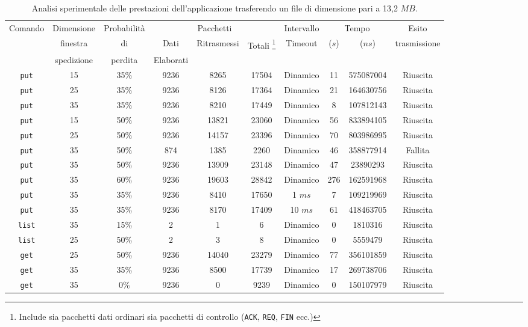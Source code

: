 \documentclass[10pt,a4paper, titlepage]{report}
\begin{document}
\begin{savenotes}
\begin{table}[H]
\caption{Analisi sperimentale delle prestazioni dell'applicazione trasferendo un file di dimensione pari a 13,2 $MB$.}\label{table:diana}
\centering
\begin{adjustbox}{width=1.3\textwidth,center=\textwidth}
\small
\begin{tabular}{ccc|ccc|c|cc|c}

\toprule
\multirow{3}{*}{Comando} & 
Dimensione & 
Probabilità & 
\multicolumn{3}{c|}{Pacchetti} & 
Intervallo & 
\multicolumn{2}{c|}{Tempo} &
Esito \\ 
& finestra & di & Dati & Ritrasmessi & Totali \footnote{Include sia pacchetti dati ordinari sia pacchetti di controllo (\texttt{ACK}, \texttt{REQ}, \texttt{FIN} ecc.)} & Timeout & ($s$) & ($ns$) & trasmissione \\
& spedizione & perdita & Elaborati &&&&& & \\		 
 					 
\midrule

\texttt{put}  & 15     & 35\%	& 9236 & 8265 & 17504 & Dinamico & 11  & 575087004 & Riuscita \\
\texttt{put}  & 25     & 35\%	& 9236 & 8126 & 17364 & Dinamico & 21  & 164630756 & Riuscita \\
\texttt{put}  & 35     & 35\%	& 9236 & 8210 & 17449 & Dinamico & 8  & 107812143 & Riuscita \\
\texttt{put}  & 15     & 50\%	& 9236 & 13821 & 23060 & Dinamico & 56  & 833894105 & Riuscita \\
\texttt{put}  & 25     & 50\%	& 9236 & 14157 & 23396 & Dinamico & 70  & 803986995 & Riuscita \\
\texttt{put}  & 35     & 50\%	& 874  & 1385 & 2260 & Dinamico & 46  & 358877914 & Fallita \\
\texttt{put}  & 35     & 50\%	& 9236 & 13909 & 23148 & Dinamico & 47  & 23890293 & Riuscita \\
\texttt{put}  & 35     & 60\%	& 9236 & 19603 & 28842 & Dinamico & 276  & 162591968 & Riuscita \\
\texttt{put}  & 35     & 35\%	& 9236 & 8410 & 17650 &  1 $ms$ & 7  & 109219969 & Riuscita \\
\texttt{put}  & 35     & 35\%	& 9236 & 8170 & 17409 &  10 $ms$ & 61  & 418463705 & Riuscita \\						
\texttt{list}  & 35     & 15\%	& 2 & 1 & 6 &  Dinamico & 0  & 1810316 & Riuscita \\							
\texttt{list}  & 25     & 50\%	& 2 & 3 & 8 &  Dinamico & 0  & 5559479 & Riuscita \\						
\texttt{get}  & 25     & 50\%	& 9236 & 14040 & 23279 &  Dinamico & 77  & 356101859 & Riuscita \\						
\texttt{get}  & 35     & 35\%	& 9236 & 8500 & 17739 & Dinamico & 17  & 269738706 & Riuscita \\
\texttt{get}  & 35     & 0\%	    & 9236 & 0    & 9239 & Dinamico & 0  & 150107979 & Riuscita \\
				

\end{tabular}
\end{adjustbox}
\end{table}
\end{savenotes}
\end{document}
